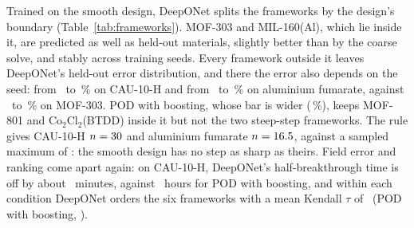 \documentclass[10pt,a4paper]{article}
\begin{document}
Trained on the smooth design, DeepONet splits the frameworks by the design's boundary
(Table~\ref{tab:frameworks}). MOF-303 and MIL-160(Al), which lie
inside it, are predicted as well as held-out materials, slightly better than by the
coarse solve, and stably across training seeds. Every framework outside it leaves
DeepONet's held-out error distribution, and there the error also depends on the seed: from
\nSeedCauMin\ to \nSeedCauMax\,\% on CAU-10-H and from \nSeedAlfMin\ to \nSeedAlfMax\,\% on
aluminium fumarate, against \nSeedMofThreeMin\ to \nSeedMofThreeMax\,\% on MOF-303. POD with
boosting, whose bar is wider (\nFwHgbPninetyfive\,\%), keeps MOF-801 and
Co\(_2\)Cl\(_2\)(BTDD) inside it but not the two steep-step frameworks. The rule gives
CAU-10-H \(n = 30\) and aluminium fumarate \(n = 16.5\), against a sampled maximum of
\nDcNexpHi: the smooth design has no step as sharp as theirs. Field error and ranking come
apart again: on CAU-10-H, DeepONet's half-breakthrough time is off by about
\nFwCauTerrDonMin\ minutes, against \nFwCauTerrHgbH\ hours for POD with boosting, and within
each condition DeepONet orders the six frameworks with a mean Kendall \(\tau\) of
\nFwTauDon\ (POD with boosting, \nFwTauHgb).
\end{document}
